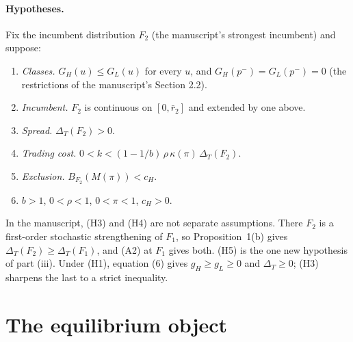 \documentclass[12pt]{article}
\theoremstyle{remark}
\newcommand{\Dt}{\Delta_T}
\begin{document}
\paragraph{Hypotheses.}
Fix the incumbent distribution $F_2$ (the manuscript's strongest incumbent) and suppose:
\begin{enumerate}
\item[(H1)] \emph{Classes.} $G_H(u)\le G_L(u)$ for every $u$, and $G_H(p^-)=G_L(p^-)=0$
  (the restrictions of the manuscript's Section 2.2).
\item[(H2)] \emph{Incumbent.} $F_2$ is continuous on $[0,\bar r_2]$ and extended by one above.
\item[(H3)] \emph{Spread.} $\Dt(F_2)>0$.
\item[(H4)] \emph{Trading cost.} $0<k<(1-1/b)\,\rho\,\kappa(\pi)\,\Dt(F_2)$.
\item[(H5)] \emph{Exclusion.} $B_{F_2}(M(\pi))<c_H$.
\item[(H6)] $b>1$, $0<\rho<1$, $0<\pi<1$, $c_H>0$.
\end{enumerate}
In the manuscript, (H3) and (H4) are not separate
assumptions. There $F_2$ is a first-order stochastic strengthening of $F_1$, so Proposition~1(b)
gives $\Dt(F_2)\ge\Dt(F_1)$, and (A2) at $F_1$ gives both. (H5) is the one new hypothesis of part (iii). Under (H1), equation (6) gives
$g_H\ge g_L\ge0$ and $\Dt\ge0$; (H3) sharpens the last to a strict inequality.

\section{The equilibrium object}
\end{document}
